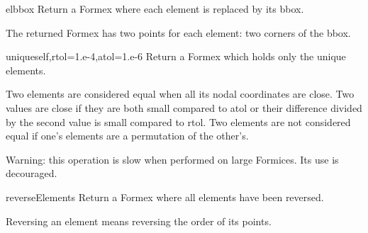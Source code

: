 \begin{methoddesc}{elbbox}{}
Return a Formex where each element is replaced by its bbox.

The returned Formex has two points for each element: two corners
of the bbox.
\end{methoddesc}

\begin{methoddesc}{unique}{self,rtol=1.e-4,atol=1.e-6}
Return a Formex which holds only the unique elements.

Two elements are considered equal when all its nodal coordinates
are close. Two values are close if they are both small compared to atol
or their difference divided by the second value is small compared to
rtol.
Two elements are not considered equal if one's elements are a
permutation of the other's.

Warning: this operation is slow when performed on large Formices.
Its use is decouraged.
\end{methoddesc}

\begin{methoddesc}{reverseElements}{}
Return a Formex where all elements have been reversed.

Reversing an element means reversing the order of its points.
\end{methoddesc}



